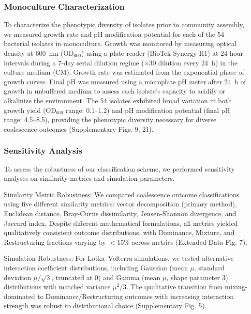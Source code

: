 \subsubsection*{Monoculture Characterization}
\label{sec:suppl:monoculture}

To characterize the phenotypic diversity of isolates prior to community assembly, we measured growth rate and pH modification potential for each of the 54 bacterial isolates in monoculture. Growth was monitored by measuring optical density at 600~nm (OD$_{600}$) using a plate reader (BioTek Synergy H1) at 24-hour intervals during a 7-day serial dilution regime ($\times$30 dilution every 24~h) in the culture medium (CM). Growth rate was estimated from the exponential phase of growth curves. Final pH was measured using a microplate pH meter after 24~h of growth in unbuffered medium to assess each isolate's capacity to acidify or alkalinize the environment. The 54 isolates exhibited broad variation in both growth yield (OD$_{600}$ range: 0.1--1.2) and pH modification potential (final pH range: 4.5--8.5), providing the phenotypic diversity necessary for diverse coalescence outcomes (Supplementary Figs. 9, 21).


\subsubsection*{Sensitivity Analysis}
\label{sec:suppl:sensitivity}

To assess the robustness of our classification scheme, we performed sensitivity analyses on similarity metrics and simulation parameters.

Similarity Metric Robustness: We compared coalescence outcome classifications using five different similarity metrics: vector decomposition (primary method), Euclidean distance, Bray-Curtis dissimilarity, Jensen-Shannon divergence, and Jaccard index. Despite different mathematical formulations, all metrics yielded qualitatively consistent outcome distributions, with Dominance, Mixture, and Restructuring fractions varying by $<$15\% across metrics (Extended Data Fig. 7).

Simulation Robustness: For Lotka--Volterra simulations, we tested alternative interaction coefficient distributions, including Gaussian (mean $\mu$, standard deviation $\mu/\sqrt{3}$, truncated at 0) and Gamma (mean $\mu$, shape parameter 3) distributions with matched variance $\mu^2/3$. The qualitative transition from mixing-dominated to Dominance/Restructuring outcomes with increasing interaction strength was robust to distributional choice (Supplementary Fig. 5).

